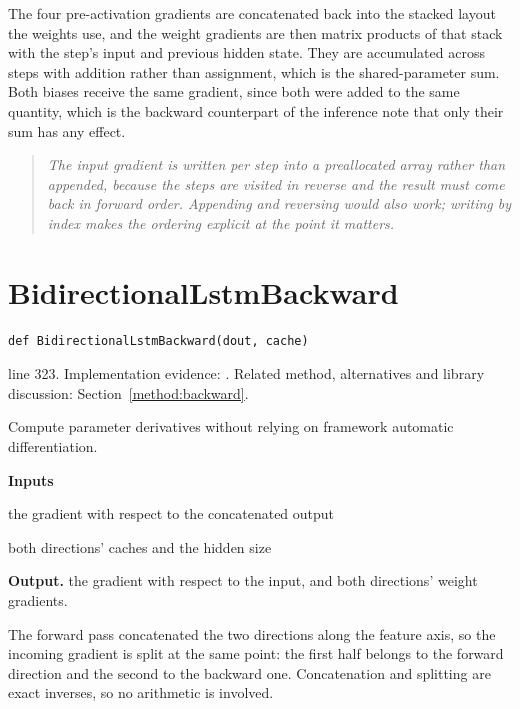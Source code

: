 The four pre-activation gradients are concatenated back into the stacked layout the weights use, and the weight gradients are then matrix products of that stack with the step's input and previous hidden state. They are accumulated across steps with addition rather than assignment, which is the shared-parameter sum. Both biases receive the same gradient, since both were added to the same quantity, which is the backward counterpart of the inference note that only their sum has any effect.


\begin{quote}\small\itshape The input gradient is written per step into a preallocated array rather than appended, because the steps are visited in reverse and the result must come back in forward order. Appending and reversing would also work; writing by index makes the ordering explicit at the point it matters.\end{quote}


\section{BidirectionalLstmBackward}\label{fn:train:BidirectionalLstmBackward}
\begin{lstlisting}[style=sig]
def BidirectionalLstmBackward(dout, cache)
\end{lstlisting}
 line 323. Implementation evidence: \cite{code2026}. Related method, alternatives and library discussion: Section~\ref{method:backward}.


Compute parameter derivatives without relying on framework automatic differentiation.




\noindent\textbf{Inputs}
\begin{description}[leftmargin=2.2em,style=nextline,font=\normalfont\ttfamily]\setlength\itemsep{1pt}
  \item[{dout}] \normalfont the gradient with respect to the concatenated output
  \item[{cache}] \normalfont both directions' caches and the hidden size
\end{description}

\noindent\textbf{Output.} the gradient with respect to the input, and both directions' weight gradients.


The forward pass concatenated the two directions along the feature axis, so the incoming gradient is split at the same point: the first half belongs to the forward direction and the second to the backward one. Concatenation and splitting are exact inverses, so no arithmetic is involved.


